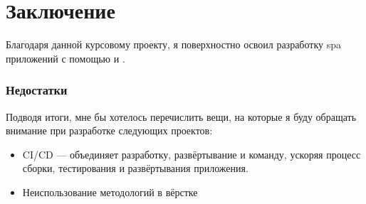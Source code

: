 \section{Заключение}
Благодаря данной курсовому проекту, я поверхностно освоил разработку \acrshort{spa} приложений с помощью \textcite{react} и \textcite{express}.

\subsubsection{Недостатки}
Подводя итоги, мне бы хотелось перечислить вещи, на которые я буду обращать внимание при разработке следующих проектов:
\begin{itemize}
    \item CI/CD --- объединяет разработку, развёртывание и команду, ускоряя процесс сборки, тестирования и развёртывания приложения.
    \item Неиспользование методологий в вёрстке
\end{itemize}

\clearpage